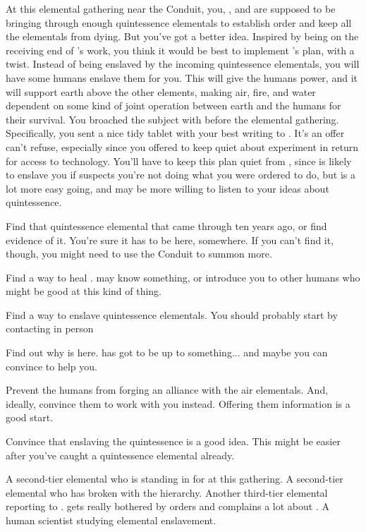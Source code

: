 \documentclass[char]{elementals}
\begin{document}
At this elemental gathering near the Conduit, you, \cLoyal{}, and \cMiniEarth{} are supposed to be bringing through enough quintessence elementals to establish order and keep all the elementals from dying.  But you've got a better idea.  Inspired by being on the receiving end of \cMS{}'s work, you think it would be best to implement \cLoyal{}'s plan, with a twist.  Instead of being enslaved by the incoming quintessence elementals, you will have some humans enslave them for you.  This will give the humans power, and it will support earth above the other elements, making air, fire, and water dependent on some kind of joint operation between earth and the humans for their survival.  You broached the subject with \cMS{} before the elemental gathering.  Specifically, you sent a nice tidy tablet with your best writing to \cMS{\them}.  It's an offer \cMS{} can't refuse, especially since you offered to keep quiet about \cMS{\their} experiment in return for access to \cMS{\their} technology.  You'll have to keep this plan quiet from \cLoyal{}, since \cLoyal{\they} is likely to enslave you if \cLoyal{\they} suspects you're not doing what you were ordered to do, but \cRogue{} is a lot more easy going, and may be more willing to listen to your ideas about quintessence.

\begin{itemz}[Goals]
	\item Find that quintessence elemental that came through ten years ago, or find evidence of it.  You're sure it has to be here, somewhere. If you can't find it, though, you might need to use the Conduit to summon more.
	\item Find a way to heal \cEarthKing{}.  \cMS{} may know something, or introduce you to other humans who might be good at this kind of thing.
	\item Find a way to enslave quintessence elementals.  You should probably start by contacting \cMS{} in person
	\item Find out why \cRogue{} is here.  \cRogue{\They} has got to be up to something... and maybe you can convince \cRogue{\them} to help you.
	\item Prevent the humans from forging an alliance with the air elementals.  And, ideally, convince them to work with you instead.  Offering them information is a good start.
	\item Convince \cLoyal{} that enslaving the quintessence is a good idea.  This might be easier after you've caught a quintessence elemental already.
\end{itemz}

\begin{contacts}
	\contact{\cLoyal{}}  A second-tier elemental who is standing in for \cEarthKing{} at this gathering.
	\contact{\cRogue{}}  A second-tier elemental who has broken with the hierarchy.
  \contact{\cMiniEarth{}}  Another third-tier elemental reporting to \cLoyal{}.  \cMiniEarth{\They} gets really bothered by orders and complains a lot about \cLoyal{}.
	\contact{\cMS{}}  A human scientist studying elemental enslavement.
\end{contacts}
\end{document}
